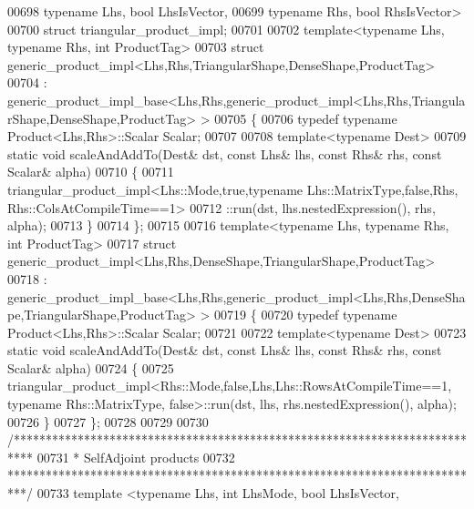 \begin{DoxyCode}
00698          \textcolor{keyword}{typename} Lhs, \textcolor{keywordtype}{bool} LhsIsVector,
00699          \textcolor{keyword}{typename} Rhs, \textcolor{keywordtype}{bool} RhsIsVector>
00700 \textcolor{keyword}{struct }triangular\_product\_impl;
00701 
00702 \textcolor{keyword}{template}<\textcolor{keyword}{typename} Lhs, \textcolor{keyword}{typename} Rhs, \textcolor{keywordtype}{int} ProductTag>
00703 \textcolor{keyword}{struct }generic\_product\_impl<Lhs,Rhs,TriangularShape,DenseShape,ProductTag>
00704   : generic\_product\_impl\_base<Lhs,Rhs,generic\_product\_impl<Lhs,Rhs,TriangularShape,DenseShape,ProductTag> >
00705 \{
00706   \textcolor{keyword}{typedef} \textcolor{keyword}{typename} Product<Lhs,Rhs>::Scalar Scalar;
00707   
00708   \textcolor{keyword}{template}<\textcolor{keyword}{typename} Dest>
00709   \textcolor{keyword}{static} \textcolor{keywordtype}{void} scaleAndAddTo(Dest& dst, \textcolor{keyword}{const} Lhs& lhs, \textcolor{keyword}{const} Rhs& rhs, \textcolor{keyword}{const} Scalar& alpha)
00710   \{
00711     triangular\_product\_impl<Lhs::Mode,true,typename Lhs::MatrixType,false,Rhs, Rhs::ColsAtCompileTime==1>
00712         ::run(dst, lhs.nestedExpression(), rhs, alpha);
00713   \}
00714 \};
00715 
00716 \textcolor{keyword}{template}<\textcolor{keyword}{typename} Lhs, \textcolor{keyword}{typename} Rhs, \textcolor{keywordtype}{int} ProductTag>
00717 \textcolor{keyword}{struct }generic\_product\_impl<Lhs,Rhs,DenseShape,TriangularShape,ProductTag>
00718 : generic\_product\_impl\_base<Lhs,Rhs,generic\_product\_impl<Lhs,Rhs,DenseShape,TriangularShape,ProductTag> >
00719 \{
00720   \textcolor{keyword}{typedef} \textcolor{keyword}{typename} Product<Lhs,Rhs>::Scalar Scalar;
00721   
00722   \textcolor{keyword}{template}<\textcolor{keyword}{typename} Dest>
00723   \textcolor{keyword}{static} \textcolor{keywordtype}{void} scaleAndAddTo(Dest& dst, \textcolor{keyword}{const} Lhs& lhs, \textcolor{keyword}{const} Rhs& rhs, \textcolor{keyword}{const} Scalar& alpha)
00724   \{
00725     triangular\_product\_impl<Rhs::Mode,false,Lhs,Lhs::RowsAtCompileTime==1, typename Rhs::MatrixType,
       false>::run(dst, lhs, rhs.nestedExpression(), alpha);
00726   \}
00727 \};
00728 
00729 
00730 \textcolor{comment}{/***************************************************************************}
00731 \textcolor{comment}{* SelfAdjoint products}
00732 \textcolor{comment}{***************************************************************************/}
00733 \textcolor{keyword}{template} <\textcolor{keyword}{typename} Lhs, \textcolor{keywordtype}{int} LhsMode, \textcolor{keywordtype}{bool} LhsIsVector,

\end{DoxyCode}
